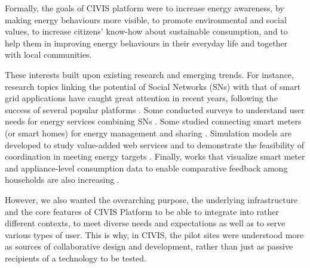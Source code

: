Formally, the goals of CIVIS platform were to increase energy awareness, by making energy behaviours more visible, to promote
environmental and social values, to increase citizens' know-how about sustainable consumption, and to help
them in improving energy behaviours in their everyday life and together with local communities.

These interests built upon existing research and emerging trends.
For instance, research topics linking the potential of Social Networks (SNs) with that of smart grid applications 
have caught great attention in recent years, following the success of several popular platforms 
\cite{Boslet2010,Chima2011,Erickson2012,Fang2013,Huang2015}. 
Some conducted surveys to understand user needs for energy services combining SNs \cite{Silva2012}. 
Some studied connecting smart meters (or smart homes) for energy management and
sharing \cite{Ciuciu2012,Steinheimer2012}. 
Simulation models are developed to study value-added web services \cite{De-Haan2011,Lei2012,Chatzidimitriou2013} and to 
demonstrate the feasibility of coordination in meeting energy targets \cite{Worm2013,Skopik2014}.
Finally, works that visualize smart meter and appliance-level consumption data to enable comparative 
feedback among households are also increasing \cite{Petkov2011,Weiss2012,Dillahunt2014}.

However, we also wanted the overarching purpose, the underlying infrastructure and the core features of 
CIVIS Platform to be able to integrate 
into rather different contexts, to meet diverse needs and expectations as well as to serve various 
types of user. This is why, in CIVIS, the pilot sites were understood more as sources of collaborative design and development,
rather than just as passive recipients of a technology to be tested.  

